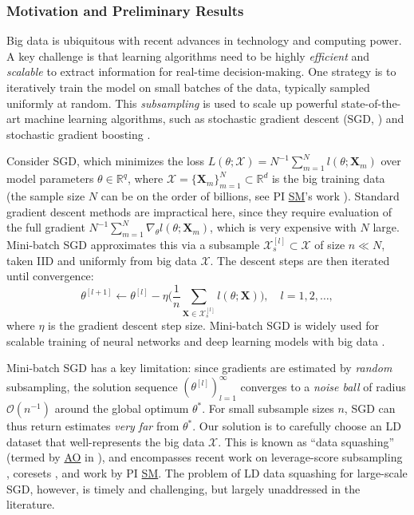 \documentclass[11pt]{NSFamsart}
\newcommand{\SM}{\hyperlink{SMlink}{SM}\xspace}
\newcommand{\AO}{\hyperlink{AOlink}{AO}\xspace}
\newcommand{\bX}{{\boldsymbol{X}}}
\begin{document}
\subsubsection{Motivation and Preliminary Results} 
Big data is ubiquitous with recent advances in technology and computing power. A key challenge is that learning algorithms need to be highly \textit{efficient} and \textit{scalable} to extract information for real-time decision-making. One strategy is to iteratively train the model on small batches of the data, typically sampled uniformly at random. This \textit{subsampling} is used to scale up powerful state-of-the-art machine learning algorithms, such as stochastic gradient descent (SGD, \cite{Bot2010}) and stochastic gradient boosting \cite{friedman2002stochastic}.

\sloppypar Consider SGD, which minimizes the loss $L(\theta;\mathcal{X}) = N^{-1} \sum_{m=1}^N l(\theta;\bX_m)$ over model parameters $\theta \in \mathbb{R}^q$, where $\mathcal{X} = \{\bX_m\}_{m=1}^N \subset \mathbb{R}^d$ is the big training data (the sample size $N$ can be on the order of billions, see PI \SM's work \cite{mak2018efficient}). Standard gradient descent methods \cite{nocedal2006numerical} are impractical here, since they require evaluation of the full gradient $N^{-1} \sum_{m=1}^N \nabla_\theta l(\theta;\bX_m)$, which is very expensive with $N$ large. Mini-batch SGD \cite{Bot2010} approximates this via a subsample $\mathcal{X}_{s}^{[l]} \subset \mathcal{X}$ of size $n \ll N$, taken IID and uniformly from big data $\mathcal{X}$. The descent steps are then iterated until convergence:
\begin{equation}\label{eq:sgdopt}
\theta^{[l+1]} \leftarrow \theta^{[l]} - \eta \Biggl( \frac{1}{n} \sum_{\bX \in \mathcal{X}_{s}^{[l]}} l(\theta;\bX)\Biggr) , \quad l = 1, 2, \ldots,
\end{equation}
where $\eta$ is the gradient descent step size. Mini-batch SGD is widely used for scalable training of neural networks and deep learning models with big data \citep{srivastava2014dropout}.

Mini-batch SGD has a key limitation: since gradients are estimated by \textit{random} subsampling, the solution sequence $(\theta^{[l]})_{l=1}^\infty$ converges to a \textit{noise ball} of radius $\mathcal{O}(n^{-1})$ around the global optimum $\theta^*$. For small subsample sizes $n$, SGD can thus return estimates
\textit{very far} from  $\theta^*$. Our solution is to carefully choose an LD dataset that well-represents the big data $\mathcal{X}$. This is known as ``data squashing'' (termed by \AO in \cite{owen2003data}), and encompasses recent work on leverage-score subsampling \cite{ma2015statistical}, coresets \cite{chan2006faster,bachem2017practical, huggins2016coresets}, and work by PI \SM \cite{mak2018support,mak2018minimax,mak2017projected,krishna2019distributional}. The problem of LD data squashing for large-scale SGD, however, is timely and challenging, but largely unaddressed in the literature.
\end{document}
